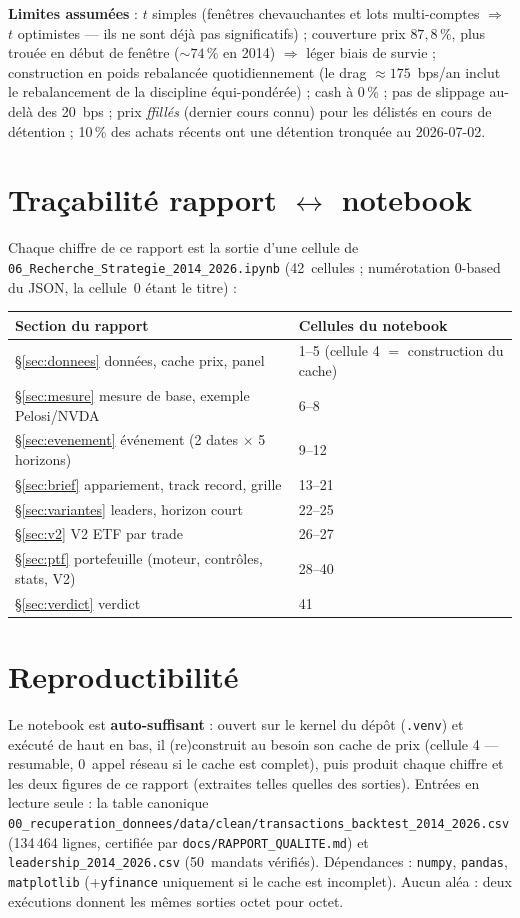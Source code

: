 \documentclass[11pt,a4paper]{article}
\newcommand{\code}[1]{\texttt{\small #1}}
\begin{document}
\textbf{Limites assumées} : $t$ simples (fenêtres chevauchantes et lots multi-comptes $\Rightarrow$ $t$
optimistes --- ils ne sont déjà pas significatifs) ; couverture prix $87{,}8\,\%$, plus trouée en début de
fenêtre ($\sim74\,\%$ en 2014) $\Rightarrow$ léger biais de survie ; construction en poids rebalancée
quotidiennement (le drag $\approx175$~bps/an inclut le rebalancement de la discipline équi-pondérée) ;
cash à 0\,\% ; pas de slippage au-delà des 20~bps ; prix \emph{ffillés} (dernier cours connu) pour les
délistés en cours de détention ; 10\,\% des achats récents ont une détention tronquée au 2026-07-02.

\appendix
\section{Traçabilité rapport $\leftrightarrow$ notebook}\label{app:trace}
Chaque chiffre de ce rapport est la sortie d'une cellule de
\code{06\_Recherche\_Strategie\_2014\_2026.ipynb} (42~cellules ; numérotation 0-based du JSON, la
cellule~0 étant le titre) :
\begin{center}\small
\begin{tabular}{ll}
\toprule
Section du rapport & Cellules du notebook \\
\midrule
\S\ref{sec:donnees} données, cache prix, panel & 1--5 (cellule 4 $=$ construction du cache) \\
\S\ref{sec:mesure} mesure de base, exemple Pelosi/NVDA & 6--8 \\
\S\ref{sec:evenement} événement (2 dates $\times$ 5 horizons) & 9--12 \\
\S\ref{sec:brief} appariement, track record, grille & 13--21 \\
\S\ref{sec:variantes} leaders, horizon court & 22--25 \\
\S\ref{sec:v2} V2 ETF par trade & 26--27 \\
\S\ref{sec:ptf} portefeuille (moteur, contrôles, stats, V2) & 28--40 \\
\S\ref{sec:verdict} verdict & 41 \\
\bottomrule
\end{tabular}
\end{center}

\section{Reproductibilité}
Le notebook est \textbf{auto-suffisant} : ouvert sur le kernel du dépôt (\code{.venv}) et exécuté de haut
en bas, il (re)construit au besoin son cache de prix (cellule 4 --- resumable, $0$~appel réseau si le
cache est complet), puis produit chaque chiffre et les deux figures de ce rapport (extraites telles
quelles des sorties). Entrées en lecture seule : la table canonique
\code{00\_recuperation\_donnees/data/clean/transactions\_backtest\_2014\_2026.csv} (134\,464 lignes, certifiée par
\code{docs/RAPPORT\_QUALITE.md}) et \code{leadership\_2014\_2026.csv} (50~mandats vérifiés). Dépendances :
\code{numpy}, \code{pandas}, \code{matplotlib} (+\code{yfinance} uniquement si le cache est incomplet).
Aucun aléa : deux exécutions donnent les mêmes sorties octet pour octet.
\end{document}
